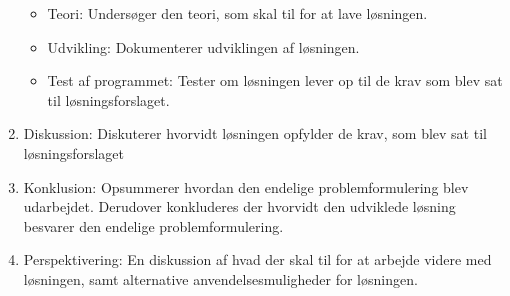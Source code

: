 \begin{enumerate}
  \begin{itemize}
    \item Teori: Undersøger den teori, som skal til for at lave løsningen.
    \item Udvikling: Dokumenterer udviklingen af løsningen.
    \item Test af programmet: Tester om løsningen lever op til de krav som blev sat til løsningsforslaget.
  \end{itemize}
\item Diskussion: Diskuterer hvorvidt løsningen opfylder de krav, som blev sat til løsningsforslaget
\item Konklusion: Opsummerer hvordan den endelige problemformulering blev udarbejdet. Derudover konkluderes der hvorvidt den udviklede løsning besvarer den endelige problemformulering.
\item Perspektivering: En diskussion af hvad der skal til for at arbejde videre med løsningen, samt alternative anvendelsesmuligheder for løsningen.
\end{enumerate}

\clearpage
